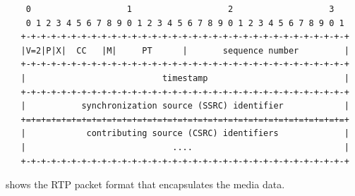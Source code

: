 
\begin{figure}[!h]
\begin{spacing}{0.5}
\centering
{\small
\begin{verbatim}
    0                   1                   2                   3
    0 1 2 3 4 5 6 7 8 9 0 1 2 3 4 5 6 7 8 9 0 1 2 3 4 5 6 7 8 9 0 1
   +-+-+-+-+-+-+-+-+-+-+-+-+-+-+-+-+-+-+-+-+-+-+-+-+-+-+-+-+-+-+-+-+
   |V=2|P|X|  CC   |M|     PT      |       sequence number         |
   +-+-+-+-+-+-+-+-+-+-+-+-+-+-+-+-+-+-+-+-+-+-+-+-+-+-+-+-+-+-+-+-+
   |                           timestamp                           |
   +-+-+-+-+-+-+-+-+-+-+-+-+-+-+-+-+-+-+-+-+-+-+-+-+-+-+-+-+-+-+-+-+
   |           synchronization source (SSRC) identifier            |
   +=+=+=+=+=+=+=+=+=+=+=+=+=+=+=+=+=+=+=+=+=+=+=+=+=+=+=+=+=+=+=+=+
   |            contributing source (CSRC) identifiers             |
   |                             ....                              |
   +-+-+-+-+-+-+-+-+-+-+-+-+-+-+-+-+-+-+-+-+-+-+-+-+-+-+-+-+-+-+-+-+
\end{verbatim}
}
\end{spacing}
\caption{shows the RTP packet format that encapsulates the media data.}
\label{fig:3:rtp.hdr}
\end{figure}


